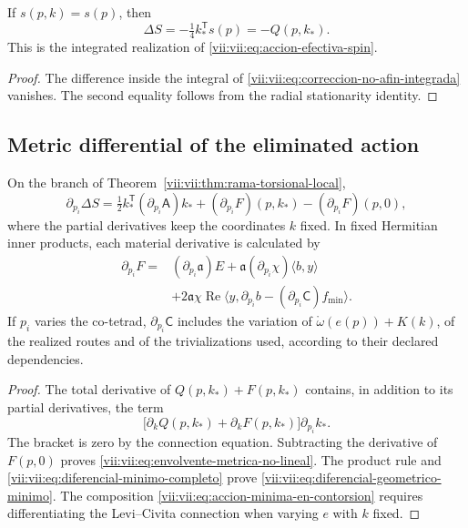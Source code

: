 \begin{corollary}
\label{vii:vii:cor:recuperacion-eliminacion-afin}
If \(s(p,k)=s(p)\), then
\[
 \Delta S=-\tfrac14 k_*^{\mathsf T}s(p)=-Q(p,k_*).
\]
This is the integrated realization of
\eqref{vii:vii:eq:accion-efectiva-spin}.
\end{corollary}
\begin{proof}
The difference inside the integral of
\eqref{vii:vii:eq:correccion-no-afin-integrada} vanishes. The second
equality follows from the radial stationarity identity.
\end{proof}

\subsection{Metric differential of the eliminated action}
\label{vii:vii:subsec:diferencial-metrico-no-lineal}

\begin{theorem}
\label{vii:vii:thm:envolvente-metrica}
On the branch of Theorem~\ref{vii:vii:thm:rama-torsional-local},
\begin{equation}
 \partial_{p_i}\Delta S
 =\tfrac12 k_*^{\mathsf T}(\partial_{p_i}\mathsf A)k_*
  +(\partial_{p_i}F)(p,k_*)-(\partial_{p_i}F)(p,0),
 \label{vii:vii:eq:envolvente-metrica-no-lineal}
\end{equation}
where the partial derivatives keep the coordinates \(k\) fixed.
In fixed Hermitian inner products, each material derivative is calculated by
\begin{equation}
 \begin{split}
 \partial_{p_i}F={}&(\partial_{p_i}\mathfrak a)E
       +\mathfrak a(\partial_{p_i}\chi)\langle b,y\rangle\\
   &+2\mathfrak a\chi\operatorname{Re}
       \langle y,\partial_{p_i}b
                    -(\partial_{p_i}\mathsf C)f_{\min}\rangle.
 \end{split}
 \label{vii:vii:eq:diferencial-geometrico-minimo}
\end{equation}
If \(p_i\) varies the co-tetrad, \(\partial_{p_i}\mathsf C\)
includes the variation of
\(\mathring\omega(e(p))+K(k)\), of the realized routes and of
the trivializations used, according to their declared dependencies.
\end{theorem}

\begin{proof}
The total derivative of \(Q(p,k_*)+F(p,k_*)\) contains, in
addition to its partial derivatives, the term
\[
 \bigl[\partial_kQ(p,k_*)+\partial_kF(p,k_*)\bigr]
                      \partial_{p_i}k_*.
\]
The bracket is zero by the connection equation. Subtracting the derivative
of \(F(p,0)\) proves
\eqref{vii:vii:eq:envolvente-metrica-no-lineal}.
The product rule and
\eqref{vii:vii:eq:diferencial-minimo-completo} prove
\eqref{vii:vii:eq:diferencial-geometrico-minimo}. The composition
\eqref{vii:vii:eq:accion-minima-en-contorsion} requires differentiating
the Levi--Civita connection when varying \(e\) with \(k\) fixed.
\end{proof}

